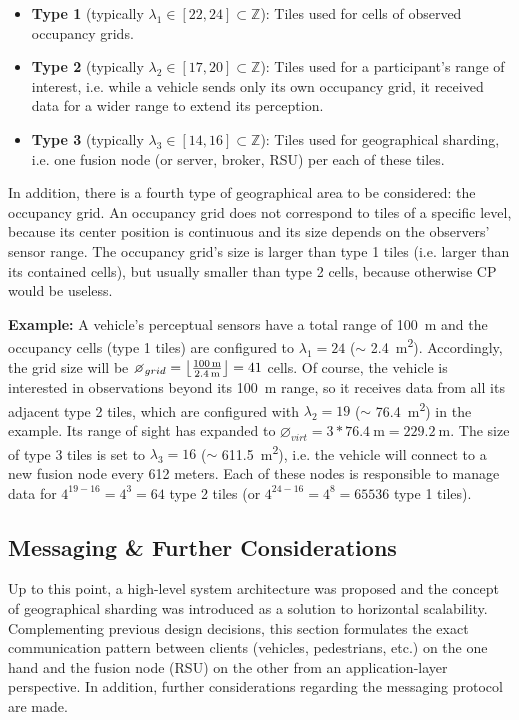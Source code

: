 \begin{itemize}
	\item \textbf{Type 1} (typically $\lambda_1 \in [22, 24] \subset \mathbb{Z}$): Tiles used for cells of observed occupancy grids.
	\item \textbf{Type 2} (typically $\lambda_2 \in [17, 20] \subset \mathbb{Z}$): Tiles used for a participant's range of interest, i.e. while a vehicle sends only its own occupancy grid, it received data for a wider range to extend its perception.
	\item \textbf{Type 3} (typically $\lambda_3 \in [14, 16] \subset \mathbb{Z}$): Tiles used for geographical sharding, i.e. one fusion node (or server, broker, RSU) per each of these tiles.
\end{itemize}

In addition, there is a fourth type of geographical area to be considered: the occupancy grid. An occupancy grid does not correspond to tiles of a specific level, because its center position is continuous and its size depends on the observers' sensor range. The occupancy grid's size is larger than type 1 tiles (i.e. larger than its contained cells), but usually smaller than type 2 cells, because otherwise CP would be useless. 
\par
\bigskip

\textbf{Example:} A vehicle's perceptual sensors have a total range of \SI{100}{\meter} and the occupancy cells (type 1 tiles) are configured to $\lambda_1 = 24$ ($\sim$ \SI{2.4}{\square\meter}). Accordingly, the grid size will be $\diameter_{grid} = \floor*{\frac{\SI{100}{\meter}}{\SI{2.4}{\meter}}} = 41$ cells. Of course, the vehicle is interested in observations beyond its \SI{100}{\meter} range, so it receives data from all its adjacent type 2 tiles, which are configured with $\lambda_2 = 19$ ($\sim$ \SI{76.4}{\square\meter}) in the example. Its range of sight has expanded to $\diameter_{virt} = 3 * \SI{76.4}{\meter} = \SI{229.2}{\meter}$. The size of type 3 tiles is set to $\lambda_3 = 16$ ($\sim$ \SI{611.5}{\square\meter}), i.e. the vehicle will connect to a new fusion node every 612 meters. Each of these nodes is responsible to manage data for $4^{19-16} = 4^3 = 64$ type 2 tiles (or $4^{24-16} = 4^8 = 65536$ type 1 tiles).

\subsection{Messaging \& Further Considerations}
\label{subsec:concept_design:messaging_further_considerations}
Up to this point, a high-level system architecture was proposed and the concept of geographical sharding was introduced as a solution to horizontal scalability. Complementing previous design decisions, this section formulates the exact communication pattern between clients (vehicles, pedestrians, etc.) on the one hand and the fusion node (RSU) on the other from an application-layer perspective. In addition, further considerations regarding the messaging protocol are made.
\par
\bigskip

